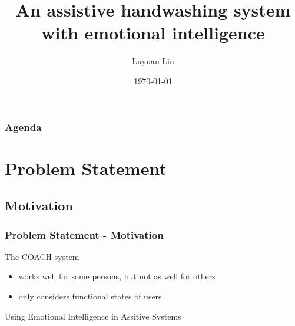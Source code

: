 \documentclass{beamer}
\title[Master Thesis Presentation]{An assistive handwashing system with emotional intelligence}
\author{Luyuan Lin} %
\institute[UWaterloo] %
{
University of Waterloo \\ %
\medskip
\textit{Supervisor:
\newline Jesse Hoey
} %
}
\date{\today} %
\begin{document}
\begin{frame}
\titlepage %
\end{frame}

\begin{frame}
\frametitle{Agenda} %
\tableofcontents %
\end{frame}


\section{Problem Statement} 
\subsection{Motivation}
\begin{frame}
\frametitle{Problem Statement - Motivation}
The COACH system
\begin{itemize}
\item works well for some persons, but not as well for others
\item only considers functional states of users
\end{itemize}
\pause
\vspace{0.5cm}
Using Emotional Intelligence in Assitive Systems
\end{frame}

\end{document}
